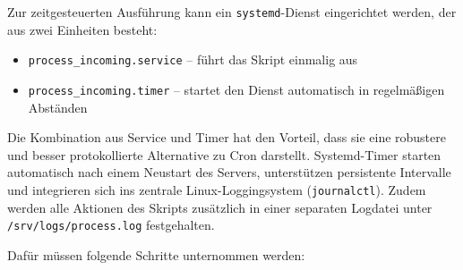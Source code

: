 \documentclass[12pt,a4paper]{report}
\begin{document}
  Zur zeitgesteuerten Ausführung kann ein \texttt{systemd}-Dienst eingerichtet werden, 
  der aus zwei Einheiten besteht:
  \begin{itemize}
    \item \texttt{process\_incoming.service} – führt das Skript einmalig aus
    \item \texttt{process\_incoming.timer} – startet den Dienst automatisch in regelmäßigen Abständen
  \end{itemize}

  Die Kombination aus Service und Timer hat den Vorteil, dass sie eine robustere und besser protokollierte Alternative zu Cron darstellt. 
  Systemd-Timer starten automatisch nach einem Neustart des Servers, unterstützen persistente Intervalle und integrieren sich ins zentrale Linux-Loggingsystem (\texttt{journalctl}). 
  Zudem werden alle Aktionen des Skripts zusätzlich in einer separaten Logdatei unter \texttt{/srv/logs/process.log} festgehalten.

  Dafür müssen folgende Schritte unternommen werden:
\end{document}
